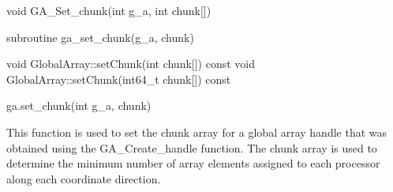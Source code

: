\documentclass[12pt]{article}
\begin{document}

\begin{capi}
\begin{ccode}
void GA_Set_chunk(int g_a, int chunk[])
\end{ccode}
\begin{funcargs}
\end{funcargs}
\end{capi}

\begin{fapi}
\begin{fcode}
subroutine ga_set_chunk(g_a, chunk)
\end{fcode}
\begin{funcargs}
\end{funcargs}
\end{fapi}

\begin{cxxapi}
\begin{cxxcode}
void GlobalArray::setChunk(int chunk[]) const
void GlobalArray::setChunk(int64_t chunk[]) const
\end{cxxcode}
\begin{funcargs}
\end{funcargs}
\end{cxxapi}

\begin{pyapi}
\begin{pycode}
ga.set_chunk(int g_a, chunk)
\end{pycode}
\begin{funcargs}
\end{funcargs}
\end{pyapi}

\gcoll

\begin{desc}

This function is used to set the chunk array for a global array handle that was
obtained using the GA_Create_handle function. The chunk array is used to
determine the minimum number of array elements assigned to each processor along
each coordinate direction.

\end{desc}
\end{document}
